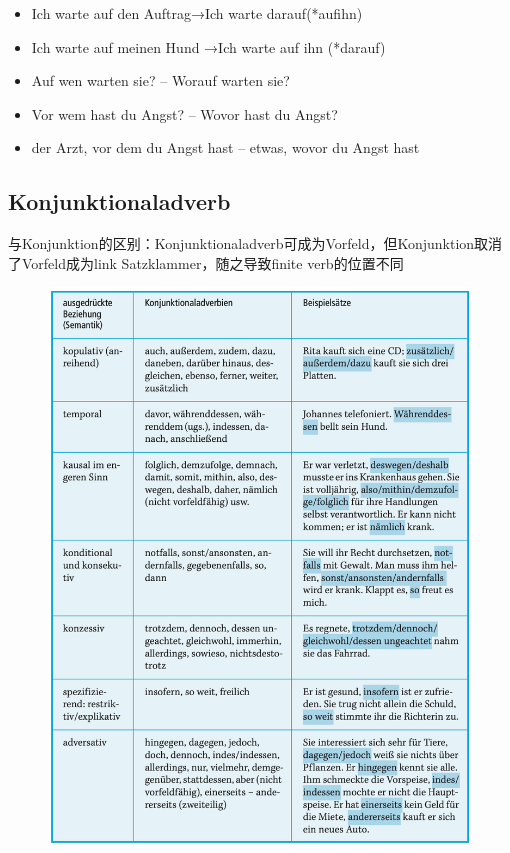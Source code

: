 \documentclass[UTF8]{report}
\begin{document}
\begin{enumerate}
    \begin{itemize}
        \item Ich warte auf den Auftrag→Ich warte darauf(*aufihn)
        \item Ich warte auf meinen Hund →Ich warte auf ihn (*darauf)
        \item Auf wen warten sie? -- Worauf warten sie?
        \item Vor wem hast du Angst? -- Wovor hast du Angst?
        \item der Arzt, vor dem du Angst hast -- etwas, wovor du Angst hast
    \end{itemize}
\end{enumerate}


\subsection{Konjunktionaladverb}
与Konjunktion的区别：Konjunktionaladverb可成为Vorfeld，但Konjunktion取消了Vorfeld成为link Satzklammer，随之导致finite verb的位置不同
\begin{figure}[H]
    \centering
    \includegraphics[scale=0.75]{ka.png}
\end{figure}
\end{document}
